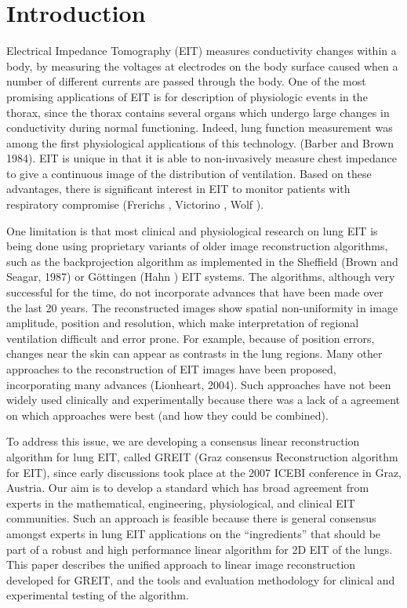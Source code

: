 \documentclass[12pt]{iopart}
\begin{document}
\section{Introduction}
Electrical Impedance Tomography (EIT) measures conductivity
changes within a body, by measuring the voltages at electrodes
on the body surface caused when a number of different
currents are passed through the body.
One of the most promising
applications of EIT is for description of physiologic events
in the thorax, since the thorax contains several
organs which undergo large changes in conductivity
during normal functioning. Indeed, lung function measurement
was among the first physiological applications of this technology.
(Barber and Brown 1984).
EIT is unique in that it is able to non-invasively
measure chest impedance to give a continuous
image of the distribution of ventilation.
Based on these advantages, there is significant
interest in EIT to 
monitor patients with respiratory compromise
(Frerichs , Victorino , Wolf ).

One limitation is that most clinical and physiological research
on lung EIT is being done using proprietary variants of
older image reconstruction algorithms, such as the backprojection
algorithm as implemented
in the Sheffield (Brown and Seagar, 1987)
or G\"ottingen (Hahn ) EIT systems.
The algorithms, although very successful for the time,
   do not incorporate advances that have been made over the last
   20 years.
The reconstructed images show
   spatial non-uniformity in image amplitude, position
   and resolution, which make interpretation of regional
   ventilation difficult and error prone.
For example, because of position errors,
changes near the skin can appear as contrasts in the lung regions.
Many other approaches to the reconstruction of EIT images have been
proposed, incorporating many advances (Lionheart, 2004).
Such approaches
have not been widely used clinically and experimentally
because there was a lack of a agreement on which
approaches were best (and how they could be combined).

To address this issue, we are developing a
consensus linear reconstruction algorithm for lung EIT,
called GREIT (Graz consensus Reconstruction algorithm for EIT),
since early discussions took place at the 2007 ICEBI conference
in Graz, Austria. Our aim is to develop a standard which
has broad agreement from experts in the mathematical,
engineering, physiological, and clinical EIT communities.
Such an approach is feasible because there is general
consensus amongst experts in lung EIT applications on
the ``ingredients'' that should
be part of a robust and high performance linear algorithm
for 2D EIT of the lungs.
This paper describes the unified approach to 
linear image reconstruction developed for GREIT,
and the tools and evaluation methodology for
clinical and experimental testing of the algorithm.
\end{document}
